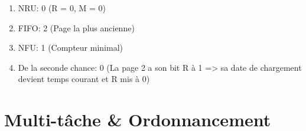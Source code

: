 \begin{enumerate}
\begin{correction}
\begin{enumerate}[label=(\alph*)]
  \item NRU: 0 (R = 0, M = 0)
  \item FIFO: 2 (Page la plus ancienne)
  \item NFU: 1 (Compteur minimal)
  \item De la seconde chance: 0 (La page 2 a son bit R à 1 => sa date de chargement devient temps courant et R mis à 0)
\end{enumerate}
\end{correction}

\end{enumerate}


\section{{Multi-tâche \& Ordonnancement}
         {\hfill{} }}


